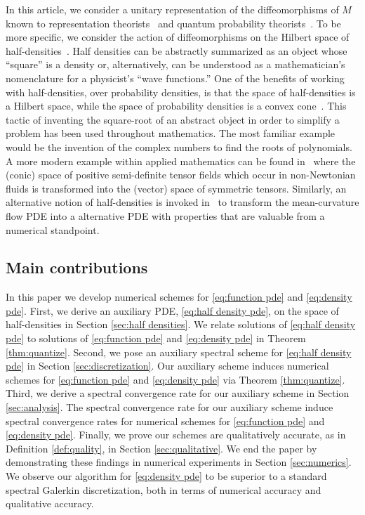 \documentclass[final,leqno]{siamart}
\begin{document}
In this article, we consider a unitary representation of the diffeomorphisms of $M$ known to representation theorists~\cite{Ismagilov1975,VershilGelfandGraev1975} and quantum probability theorists~\cite{Meyer1998}.
To be more specific, we consider the action of diffeomorphisms on the Hilbert space of half-densities~\cite{BatesWeinstein1997,GuilleminSternberg1970}.
Half densities can be abstractly summarized as an object whose ``square'' is a density
or, alternatively, can be understood as a mathematician's nomenclature for a physicist's ``wave functions.''
One of the benefits of working with half-densities, over probability densities, is that the space of half-densities is a Hilbert space, while the space of probability densities is a convex cone~\cite{GuilleminSternberg1970}.
This tactic of inventing the square-root of an abstract object in order to simplify a problem has been used throughout mathematics.
The most familiar example would be the invention of the complex numbers to find the roots of polynomials.
A more modern example within applied mathematics can be found in~\cite{Balci2011} where the (conic) space of positive semi-definite tensor fields which occur in non-Newtonian fluids is transformed into the (vector) space of symmetric tensors.
Similarly, an alternative notion of half-densities is invoked in~\cite{Crane2013} to transform the mean-curvature flow PDE into a alternative PDE with properties that are valuable from a numerical standpoint.

\subsection{Main contributions}

In this paper we develop numerical schemes for \eqref{eq:function pde} and \eqref{eq:density pde}.
First, we derive an auxiliary PDE, \eqref{eq:half density pde}, on the space of half-densities in Section \ref{sec:half densities}.
We relate solutions of \eqref{eq:half density pde} to solutions of \eqref{eq:function pde} and \eqref{eq:density pde} in Theorem \ref{thm:quantize}.
Second, we pose an auxiliary spectral scheme for \eqref{eq:half density pde} in Section \ref{sec:discretization}.
Our auxiliary scheme induces numerical schemes for \eqref{eq:function pde} and \eqref{eq:density pde} via Theorem \ref{thm:quantize}.
Third, we derive a spectral convergence rate for our auxiliary scheme in Section \ref{sec:analysis}.
The spectral convergence rate for our auxiliary scheme induce spectral convergence rates for numerical schemes for \eqref{eq:function pde} and \eqref{eq:density pde}.
Finally, we prove our schemes are qualitatively accurate, as in Definition \ref{def:quality}, in Section \ref{sec:qualitative}.
We end the paper by demonstrating these findings in numerical experiments in Section \ref{sec:numerics}.
We observe our algorithm for \eqref{eq:density pde} to be superior to a standard spectral Galerkin discretization, both in terms of numerical accuracy and qualitative accuracy.
\end{document}
